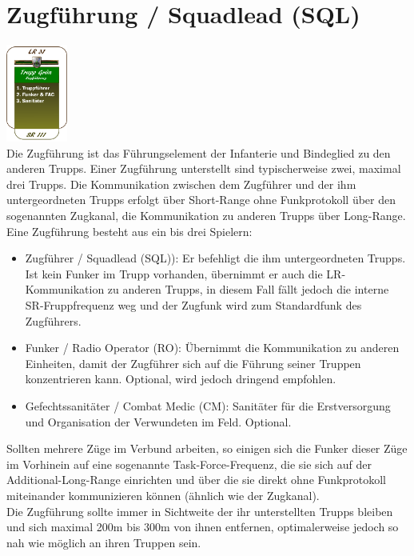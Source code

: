 \section{Zugführung / Squadlead (SQL)}
\includegraphics[width=20mm]{./img/truppenordnung/zugfuehrung/zugfuehrung.png}\\
Die Zugführung ist das Führungselement der Infanterie und Bindeglied zu den anderen Trupps. Einer Zugführung unterstellt sind typischerweise zwei, maximal drei Trupps. Die Kommunikation zwischen dem Zugführer und der ihm untergeordneten Trupps erfolgt über Short-Range ohne Funkprotokoll über den sogenannten Zugkanal, die Kommunikation zu anderen Trupps über Long-Range.\\
Eine Zugführung besteht aus ein bis drei Spielern:
\begin{itemize}
	\item Zugführer / Squadlead (SQL)): Er befehligt die ihm untergeordneten Trupps. Ist kein Funker im Trupp vorhanden, übernimmt er auch die LR-Kommunikation zu anderen Trupps, in diesem Fall fällt jedoch die interne SR-Fruppfrequenz weg und der Zugfunk wird zum Standardfunk des Zugführers.
	\item Funker / Radio Operator (RO): Übernimmt die Kommunikation zu anderen Einheiten, damit der Zugführer sich auf die Führung seiner Truppen konzentrieren kann. Optional, wird jedoch dringend empfohlen.
	\item Gefechtssanitäter / Combat Medic (CM): Sanitäter für die Erstversorgung und Organisation der Verwundeten im Feld. Optional.
\end{itemize}
Sollten mehrere Züge im Verbund arbeiten, so einigen sich die Funker dieser Züge im Vorhinein auf eine sogenannte Task-Force-Frequenz, die sie sich auf der Additional-Long-Range einrichten und über die sie direkt ohne Funkprotokoll miteinander kommunizieren können (ähnlich wie der Zugkanal).\\
Die Zugführung sollte immer in Sichtweite der ihr unterstellten Trupps bleiben und sich maximal 200m bis 300m von ihnen entfernen, optimalerweise jedoch so nah wie möglich an ihren Truppen sein.